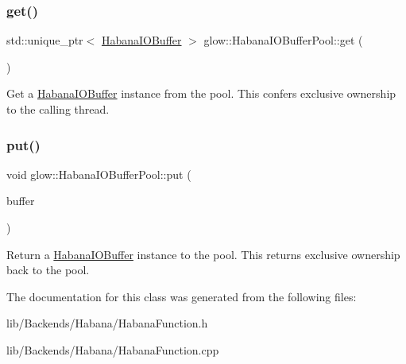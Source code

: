 \subsubsection{\texorpdfstring{get()}{get()}}
{\footnotesize\ttfamily std\+::unique\+\_\+ptr$<$ \hyperlink{classglow_1_1_habana_i_o_buffer}{Habana\+I\+O\+Buffer} $>$ glow\+::\+Habana\+I\+O\+Buffer\+Pool\+::get (\begin{DoxyParamCaption}{ }\end{DoxyParamCaption})}

Get a \hyperlink{classglow_1_1_habana_i_o_buffer}{Habana\+I\+O\+Buffer} instance from the pool. This confers exclusive ownership to the calling thread. \mbox{\label{classglow_1_1_habana_i_o_buffer_pool_a13398e7b08c52427ab3e9838a3d41697}} 
\subsubsection{\texorpdfstring{put()}{put()}}
{\footnotesize\ttfamily void glow\+::\+Habana\+I\+O\+Buffer\+Pool\+::put (\begin{DoxyParamCaption}\item[{std\+::unique\+\_\+ptr$<$ \hyperlink{classglow_1_1_habana_i_o_buffer}{Habana\+I\+O\+Buffer} $>$}]{buffer }\end{DoxyParamCaption})}

Return a \hyperlink{classglow_1_1_habana_i_o_buffer}{Habana\+I\+O\+Buffer} instance to the pool. This returns exclusive ownership back to the pool. 

The documentation for this class was generated from the following files\+:\begin{DoxyCompactItemize}
\item 
lib/\+Backends/\+Habana/Habana\+Function.\+h\item 
lib/\+Backends/\+Habana/Habana\+Function.\+cpp\end{DoxyCompactItemize}
